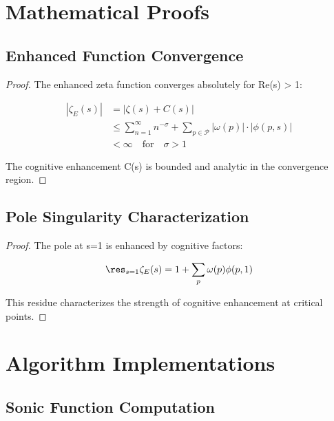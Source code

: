 \documentclass[12pt,a4paper]{article}
\begin{document}
\section{Mathematical Proofs}

\subsection{Enhanced Function Convergence}

\begin{proof}
The enhanced zeta function converges absolutely for Re(s) > 1:

\begin{align}
|\zeta_E(s)| &= |\zeta(s) + C(s)| \\
&\leq \sum_{n=1}^\infty n^{-\sigma} + \sum_{p \in \mathcal{P}} |\omega(p)| \cdot |\phi(p, s)| \\
&< \infty \quad \text{for} \quad \sigma > 1
\end{align}

The cognitive enhancement C(s) is bounded and analytic in the convergence region.
\end{proof}

\subsection{Pole Singularity Characterization}

\begin{proof}
The pole at s=1 is enhanced by cognitive factors:

\begin{equation}
\res_{s=1} \zeta_E(s) = 1 + \sum_{p} \omega(p) \phi(p, 1)
\end{equation}

This residue characterizes the strength of cognitive enhancement at critical points.
\end{proof}

\section{Algorithm Implementations}

\subsection{Sonic Function Computation}
\end{document}
